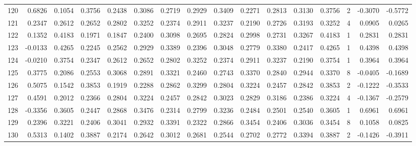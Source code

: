 \begin{tabular}{lrrrrrrrrrrrrrrr}
120 &      0.6826 &  0.1054 &  0.3756 &  0.2438 &  0.3086 &  0.2719 &  0.2929 &  0.3409 &  0.2271 &  0.2813 &   0.3130 &     0.3756 &      2 &                   -0.3070 &                    -0.5772 \\
121 &      0.2347 &  0.2612 &  0.2652 &  0.2802 &  0.3252 &  0.2374 &  0.2911 &  0.3237 &  0.2190 &  0.2726 &   0.3193 &     0.3252 &      4 &                    0.0905 &                     0.0265 \\
122 &      0.1352 &  0.4183 &  0.1971 &  0.1847 &  0.2400 &  0.3098 &  0.2695 &  0.2824 &  0.2998 &  0.2731 &   0.3267 &     0.4183 &      1 &                    0.2831 &                     0.2831 \\
123 &     -0.0133 &  0.4265 &  0.2245 &  0.2562 &  0.2929 &  0.3389 &  0.2396 &  0.3048 &  0.2779 &  0.3380 &   0.2417 &     0.4265 &      1 &                    0.4398 &                     0.4398 \\
124 &     -0.0210 &  0.3754 &  0.2347 &  0.2612 &  0.2652 &  0.2802 &  0.3252 &  0.2374 &  0.2911 &  0.3237 &   0.2190 &     0.3754 &      1 &                    0.3964 &                     0.3964 \\
125 &      0.3775 &  0.2086 &  0.2553 &  0.3068 &  0.2891 &  0.3321 &  0.2460 &  0.2743 &  0.3370 &  0.2840 &   0.2944 &     0.3370 &      8 &                   -0.0405 &                    -0.1689 \\
126 &      0.5075 &  0.1542 &  0.3853 &  0.1919 &  0.2288 &  0.2862 &  0.3299 &  0.2804 &  0.3224 &  0.2457 &   0.2842 &     0.3853 &      2 &                   -0.1222 &                    -0.3533 \\
127 &      0.4591 &  0.2012 &  0.2366 &  0.2804 &  0.3224 &  0.2457 &  0.2842 &  0.3023 &  0.2829 &  0.3186 &   0.2386 &     0.3224 &      4 &                   -0.1367 &                    -0.2579 \\
128 &     -0.3356 &  0.3605 &  0.2447 &  0.2868 &  0.3476 &  0.2314 &  0.2799 &  0.3236 &  0.2484 &  0.2501 &   0.2540 &     0.3605 &      1 &                    0.6961 &                     0.6961 \\
129 &      0.2396 &  0.3221 &  0.2406 &  0.3041 &  0.2932 &  0.3391 &  0.2322 &  0.2866 &  0.3454 &  0.2406 &   0.3036 &     0.3454 &      8 &                    0.1058 &                     0.0825 \\
130 &      0.5313 &  0.1402 &  0.3887 &  0.2174 &  0.2642 &  0.3012 &  0.2681 &  0.2544 &  0.2702 &  0.2772 &   0.3394 &     0.3887 &      2 &                   -0.1426 &                    -0.3911 \\

\end{tabular}
